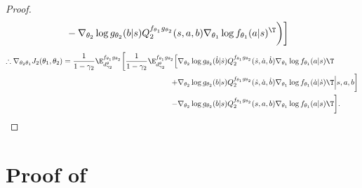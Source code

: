 \documentclass[a4paper,10pt,dvipdfmx]{jsarticle}
\begin{document}
\begin{proof}
\begin{align}
        &-\nabla_{\theta_2}\log g_{\theta_2}(b|s)Q_2^{f_{\theta_1}g_{\theta_2}}(s,a,b)\nabla_{\theta_1}\log f_{\theta_1}(a|s)^{\T}\bigg)\bigg]
    \end{align}
    \begin{align}
        \therefore\nabla_{\theta_2\theta_1}J_2(\theta_1,\theta_2)
        =\dfrac{1}{1-\gamma_2}\E_{d_{\gamma_2}^{\theta}}^{f_{\theta_1}g_{\theta_2}}\bigg[\dfrac{1}{1-\gamma_2}\E_{d_{\gamma_2}^{\theta}}^{f_{\theta_1}g_{\theta_2}}\Big[&\nabla_{\theta_2}\log g_{\theta_2}(\dot{b}|\dot{s})Q_2^{f_{\theta_1}g_{\theta_2}}(\dot{s},\dot{a},\dot{b})\nabla_{\theta_1}\log f_{\theta_1}(a|s)\T\nonumber\\
        +&\nabla_{\theta_2}\log g_{\theta_2}(b|s)Q_2^{f_{\theta_1}g_{\theta_2}}(\dot{s},\dot{a},\dot{b})\nabla_{\theta_1}\log f_{\theta_1}(\dot{a}|\dot{s})\T\Big|s,a,b\bigg]\nonumber\\
        -&\nabla_{\theta_2}\log g_{\theta_2}(b|s)Q_2^{f_{\theta_1}g_{\theta_2}}(s,a,b)\nabla_{\theta_1}\log f_{\theta_1}(a|s)\T\bigg].
    \end{align}        
\end{proof}


\section{Proof of }\label{sec:proof_SSPG_nabla_22_J_2}
\end{document}
